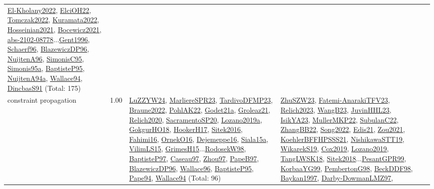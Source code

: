 {\begin{longtable}{p{3cm}r>{\raggedright\arraybackslash}p{6cm}>{\raggedright\arraybackslash}p{6cm}>{\raggedright\arraybackslash}p{8cm}}
\hyperref[detail:El-Kholany2022]{El-Kholany2022}, \hyperref[detail:ElciOH22]{ElciOH22}, \hyperref[detail:Tomczak2022]{Tomczak2022}, \hyperref[detail:Kuramata2022]{Kuramata2022}, \hyperref[detail:Hosseinian2021]{Hosseinian2021}, \hyperref[detail:Bocewicz2021]{Bocewicz2021}, \hyperref[detail:abs-2102-08778]{abs-2102-08778}...\hyperref[detail:Gent1996]{Gent1996}, \hyperref[detail:Schaerf96]{Schaerf96}, \hyperref[detail:BlazewiczDP96]{BlazewiczDP96}, \hyperref[detail:NuijtenA96]{NuijtenA96}, \hyperref[detail:SimonisC95]{SimonisC95}, \hyperref[detail:Simonis95a]{Simonis95a}, \hyperref[detail:BaptisteP95]{BaptisteP95}, \hyperref[detail:NuijtenA94a]{NuijtenA94a}, \hyperref[detail:Wallace94]{Wallace94}, \hyperref[detail:DincbasS91]{DincbasS91} (Total: 175)\\
\index{constraint propagation}\index{CP!constraint propagation}constraint propagation &  1.00 & \hyperref[detail:LuZZYW24]{LuZZYW24}, \hyperref[detail:MarliereSPR23]{MarliereSPR23}, \hyperref[detail:TardivoDFMP23]{TardivoDFMP23}, \hyperref[detail:Braune2022]{Braune2022}, \hyperref[detail:PohlAK22]{PohlAK22}, \hyperref[detail:Godet21a]{Godet21a}, \hyperref[detail:Groleaz21]{Groleaz21}, \hyperref[detail:Relich2020]{Relich2020}, \hyperref[detail:SacramentoSP20]{SacramentoSP20}, \hyperref[detail:Lozano2019a]{Lozano2019a}, \hyperref[detail:GokgurHO18]{GokgurHO18}, \hyperref[detail:HookerH17]{HookerH17}, \hyperref[detail:Sitek2016]{Sitek2016}, \hyperref[detail:Fahimi16]{Fahimi16}, \hyperref[detail:OrnekO16]{OrnekO16}, \hyperref[detail:Dejemeppe16]{Dejemeppe16}, \hyperref[detail:Siala15a]{Siala15a}, \hyperref[detail:VilimLS15]{VilimLS15}, \hyperref[detail:GrimesH15]{GrimesH15}...\hyperref[detail:RodosekW98]{RodosekW98}, \hyperref[detail:BaptisteP97]{BaptisteP97}, \hyperref[detail:Caseau97]{Caseau97}, \hyperref[detail:Zhou97]{Zhou97}, \hyperref[detail:PapeB97]{PapeB97}, \hyperref[detail:BlazewiczDP96]{BlazewiczDP96}, \hyperref[detail:Wallace96]{Wallace96}, \hyperref[detail:BaptisteP95]{BaptisteP95}, \hyperref[detail:Pape94]{Pape94}, \hyperref[detail:Wallace94]{Wallace94} (Total: 96) & \hyperref[detail:ZhuSZW23]{ZhuSZW23}, \hyperref[detail:Fatemi-AnarakiTFV23]{Fatemi-AnarakiTFV23}, \hyperref[detail:Relich2023]{Relich2023}, \hyperref[detail:WangB23]{WangB23}, \hyperref[detail:JuvinHHL23]{JuvinHHL23}, \hyperref[detail:IsikYA23]{IsikYA23}, \hyperref[detail:MullerMKP22]{MullerMKP22}, \hyperref[detail:SubulanC22]{SubulanC22}, \hyperref[detail:ZhangBB22]{ZhangBB22}, \hyperref[detail:Song2022]{Song2022}, \hyperref[detail:Edis21]{Edis21}, \hyperref[detail:Zou2021]{Zou2021}, \hyperref[detail:KoehlerBFFHPSSS21]{KoehlerBFFHPSSS21}, \hyperref[detail:NishikawaSTT19]{NishikawaSTT19}, \hyperref[detail:WikarekS19]{WikarekS19}, \hyperref[detail:Cox2019]{Cox2019}, \hyperref[detail:Lozano2019]{Lozano2019}, \hyperref[detail:TangLWSK18]{TangLWSK18}, \hyperref[detail:Sitek2018]{Sitek2018}...\hyperref[detail:PesantGPR99]{PesantGPR99}, \hyperref[detail:KorbaaYG99]{KorbaaYG99}, \hyperref[detail:PembertonG98]{PembertonG98}, \hyperref[detail:BeckDDF98]{BeckDDF98}, \hyperref[detail:Baykan1997]{Baykan1997}, \hyperref[detail:Darby-DowmanLMZ97]{Darby-DowmanLMZ97}, 
\end{longtable}}

